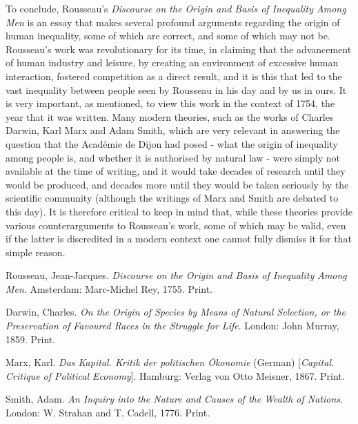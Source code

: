 To conclude, Rousseau's \textit{Discourse on the Origin and Basis of Inequality Among Men} is an essay that makes several profound arguments regarding the origin of human inequality, some of which are correct, and some of which may not be. Rousseau's work was revolutionary for its time, in claiming that the advancement of human industry and leisure, by creating an environment of excessive human interaction, fostered competition as a direct result, and it is this that led to the vast inequality between people seen by Rousseau in his day and by us in ours. It is very important, as mentioned, to view this work in the context of 1754, the year that it was written. Many modern theories, such as the works of Charles Darwin, Karl Marx and Adam Smith, which are very relevant in answering the question that the Académie de Dijon had posed - what the origin of inequality among people is, and whether it is authorised by natural law - were simply not available at the time of writing, and it would take decades of research until they would be produced, and decades more until they would be taken seriously by the scientific community (although the writings of Marx and Smith are debated to this day). It is therefore critical to keep in mind that, while these theories provide various counterarguments to Rousseau's work, some of which may be valid, even if the latter is discredited in a modern context one cannot fully dismiss it for that simple reason.

\begin{thebibliography}{9}
Rousseau, Jean-Jacques. \textit{Discourse on the Origin and Basis of Inequality Among Men}. Amsterdam: Marc-Michel Rey, 1755. Print.

Darwin, Charles. \textit{On the Origin of Species by Means of Natural Selection, or the Preservation of Favoured Races in the Struggle for Life}. London: John Murray, 1859. Print.

Marx, Karl. \textit{Das Kapital. Kritik der politischen Ökonomie} (German) [\textit{Capital. Critique of Political Economy}]. Hamburg: Verlag von Otto Meisner, 1867. Print.

Smith, Adam. \textit{An Inquiry into the Nature and Causes of the Wealth of Nations}. London: W. Strahan and T. Cadell, 1776. Print.

\end{thebibliography}


